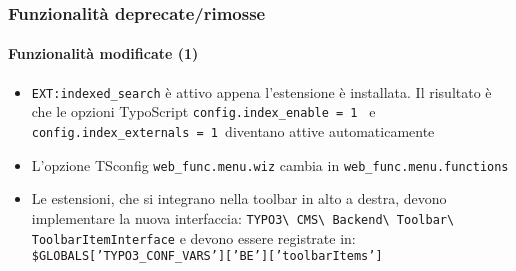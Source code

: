 \begin{frame}[fragile]
	\frametitle{Funzionalità deprecate/rimosse}
	\framesubtitle{Funzionalità modificate (1)}

	\begin{itemize}

		\item \texttt{EXT:indexed\_search} è attivo appena l'estensione è installata.
			Il risultato è che le opzioni TypoScript \small\texttt{config.index\_enable = 1 }\normalsize
			e \small\texttt{config.index\_externals = 1 }\normalsize diventano attive automaticamente
		
		\item L'opzione TSconfig \small\texttt{web\_func.menu.wiz}\normalsize\space
			cambia in \small\texttt{web\_func.menu.functions}\normalsize

		\item Le estensioni, che si integrano nella toolbar in alto a destra, devono implementare la nuova interfaccia:
			\small
				\texttt{TYPO3\textbackslash
					CMS\textbackslash
					Backend\textbackslash
					Toolbar\textbackslash
					ToolbarItemInterface}
			\normalsize\newline
			e devono essere registrate in:
			\small
				\texttt{\$GLOBALS['TYPO3\_CONF\_VARS']['BE']['toolbarItems']}
			\normalsize

	\end{itemize}

\end{frame}



